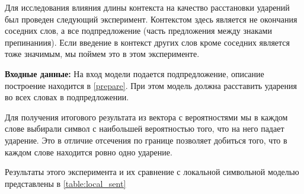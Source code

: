 \documentclass[14pt, a4paper, russian]{report}
\begin{document}
\begin{normalsize}
Для исследования влияния длины контекста на качество расстановки ударений был проведен следующий эксперимент. Контекстом здесь является не окончания соседних слов, а все подпредложение (часть предложения между знаками препинаниия). Если введение в контекст других слов кроме соседних является тоже значимым, мы поймем это в этом эксперименте.

\textbf{Входные данные:} На вход модели подается подпредложение, описание построение находится в \cref{prepare}. При этом модель должна расставить ударения во всех словах в подпредложении.

Для получения итогового результата из вектора с вероятностями мы в каждом слове выбирали символ с наибольшей вероятностью того, что на него падает ударение. Это в отличие отсечения по границе позволяет добиться того, что в каждом слове находится ровно одно ударение.

Результаты этого эксперимента и их сравнение с локальной символьной моделью представлены в \cref{table:local_sent}


\end{normalsize}
\end{document}
